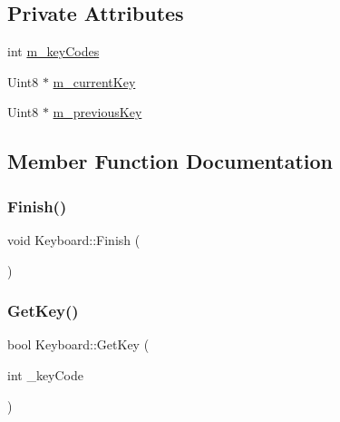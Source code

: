 \subsection*{Private Attributes}
\begin{DoxyCompactItemize}
\item 
int \mbox{\hyperlink{class_keyboard_a24b47a8a4639abfaca8347c6b16a5b4b}{m\+\_\+key\+Codes}}
\item 
Uint8 $\ast$ \mbox{\hyperlink{class_keyboard_ab8f8001628685fcda41978d5bdbb051d}{m\+\_\+current\+Key}}
\item 
Uint8 $\ast$ \mbox{\hyperlink{class_keyboard_a784ec6507f874cc67f12489fe0e6deeb}{m\+\_\+previous\+Key}}
\end{DoxyCompactItemize}


\subsection{Member Function Documentation}
\mbox{\label{class_keyboard_a817f09683a812ca7d2c737276e2b5dfa}} 
\subsubsection{\texorpdfstring{Finish()}{Finish()}}
{\footnotesize\ttfamily void Keyboard\+::\+Finish (\begin{DoxyParamCaption}{ }\end{DoxyParamCaption})}

\mbox{\label{class_keyboard_a96e37d5e981c0a27e5839de9de9f91ee}} 
\subsubsection{\texorpdfstring{Get\+Key()}{GetKey()}}
{\footnotesize\ttfamily bool Keyboard\+::\+Get\+Key (\begin{DoxyParamCaption}\item[{int}]{\+\_\+key\+Code }\end{DoxyParamCaption})}

\mbox{\label{class_keyboard_a1a10de35e37fa9a3300f2a71ef67e677}} 
